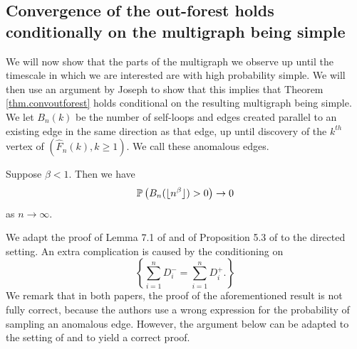 \subsection{Convergence of the out-forest holds conditionally on the multigraph being simple}
We will now show that the parts of the multigraph we observe up until the timescale in which we are interested are with high probability simple. We will then use an argument by Joseph \cite{josephComponentSizesCritical2014} to show that this implies that Theorem \ref{thm.convoutforest} holds conditional on the resulting multigraph being simple. We let $B_n(k)$ be the number of self-loops and edges created parallel to an existing edge in the same direction as that edge, up until discovery of the $k^{th}$ vertex of $(\hat{F}_n(k),k\geq 1)$. We call these anomalous edges. 
\begin{proposition}\label{prop.anomalousedges}
Suppose $\beta<1$. Then we have
$$\P\left(B_n(\lfloor n^\beta \rfloor)>0\right)\to 0$$
as $n\to \infty$.
\end{proposition}
\begin{remark}
We adapt the proof of Lemma 7.1 of \cite{josephComponentSizesCritical2014} and of Proposition 5.3 of \cite{conchon--kerjanStableGraphMetric2020} to the directed setting. An extra complication is caused by the conditioning on $$\left\{\sum_{i=1}^n D^-_i=\sum_{i=1}^n D^+_i.\right\}$$ We remark that in both papers, the proof of the aforementioned result is not fully correct, because the authors use a wrong expression for the probability of sampling an anomalous edge. However, the argument below can be adapted to the setting of \cite{josephComponentSizesCritical2014} and \cite{conchon--kerjanStableGraphMetric2020} to yield a correct proof.
\end{remark}
